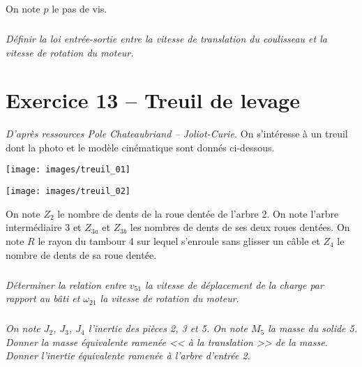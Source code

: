 \documentclass[10pt,fleqn]{article} %
\begin{document}
\begin{multicols}{2}
\begin{multicols}{2}
On note $p$ le pas de vis. 
\fi


\subparagraph{}
\textit{Définir la loi entrée-sortie entre la vitesse de translation du coulisseau et la vitesse de rotation du moteur. }
\ifprof
\begin{corrige}
\end{corrige}
\else
\fi


\section*{Exercice 13 -- Treuil de levage}
\textit{D'après ressources Pole Chateaubriand -- Joliot-Curie.}
\setcounter{exo}{0}
\ifprof
\else
On s’intéresse à un treuil dont la photo et le modèle cinématique sont donnés ci-dessous.
\begin{center}
\texttt{[image: images/treuil\_01]}
\end{center}

\begin{center}
\texttt{[image: images/treuil\_02]}
\end{center}

On note $Z_2$ le nombre de dents de la roue dentée de l'arbre 2. On note l'arbre intermédiaire 3 et $Z_{3a}$ et $Z_{3b}$ les nombres de dents de ses deux roues dentées. On note $R$ le rayon du tambour 4 sur lequel s’enroule sans glisser un câble et $Z_4$ le nombre de dents de sa roue dentée.

\fi

\subparagraph{}
\textit{Déterminer la relation entre $v_{51}$ la vitesse de déplacement de la charge par rapport au bâti et $\omega_{21}$ la vitesse de rotation du moteur.}
\ifprof
\begin{corrige}
\end{corrige}
\else
\fi


\subparagraph{}
\textit{On note $J_2$, $J_3$, $J_4$ l'inertie des pièces 2, 3 et 5. On note $M_5$ la masse du solide 5. Donner la masse équivalente ramenée << à la translation >> de la masse. Donner l'inertie équivalente ramenée à l'arbre d'entrée 2. }
\ifprof
\begin{corrige}
\end{corrige}
\else
\fi


\ifprof
\end{multicols}
\else
\end{multicols}
\fi
\end{document}
